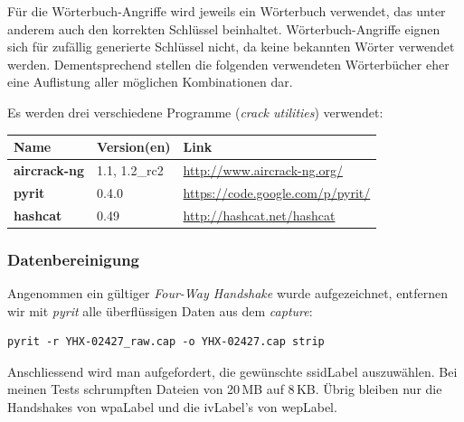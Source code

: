 Für die Wörterbuch-Angriffe wird jeweils ein Wörterbuch verwendet, das unter anderem auch den korrekten Schlüssel beinhaltet.
Wörterbuch-Angriffe eignen sich für zufällig generierte Schlüssel nicht, da keine bekannten Wörter verwendet werden.
Dementsprechend stellen die folgenden verwendeten Wörterbücher eher eine Auflistung aller möglichen Kombinationen dar.

Es werden drei verschiedene Programme (\textit{crack utilities}) verwendet:
\begin{table}[H]
\small\sffamily\centering\renewcommand{\arraystretch}{1.4}
\begin{tabular}{l l l}
\hline
\rowcolor{tableheadcolor}
  \bfseries Name  &
  \bfseries Version(en) &
  \bfseries Link \\
\hline
  \textbf{aircrack-ng} & 1.1, 1.2\_rc2 & \url{http://www.aircrack-ng.org/}\\
  \textbf{pyrit} & 0.4.0 & \url{https://code.google.com/p/pyrit/}\\
  \textbf{hashcat} & 0.49 & \url{http://hashcat.net/hashcat}\\
\hline
\end{tabular}
\end{table}


\subsubsection{Datenbereinigung}
Angenommen ein gültiger \textit{Four-Way Handshake} wurde aufgezeichnet, entfernen wir mit \textit{pyrit} alle überflüssigen Daten aus dem \textit{capture}:
\begin{lstlisting}[style=lstStyleFramed]
pyrit -r YHX-02427_raw.cap -o YHX-02427.cap strip
\end{lstlisting}
Anschliessend wird man aufgefordert, die gewünschte \gls{ssidLabel} auszuwählen.
Bei meinen Tests schrumpften Dateien von 20\,MB auf 8\,KB.
Übrig bleiben nur die Handshakes von \gls{wpaLabel} und die \gls{ivLabel}'s von \gls{wepLabel}.

